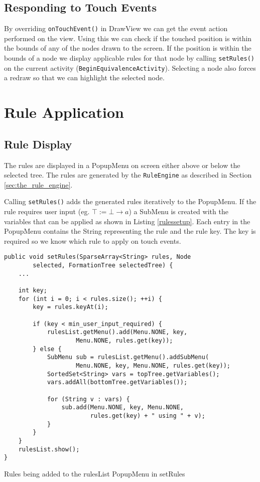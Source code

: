 \documentclass{report}
\begin{document}
\subsection{Responding to Touch Events}

By overriding {\tt onTouchEvent()} in DrawView we can get the event action performed on the view. Using this we can check if the touched position is within the bounds of any of the nodes drawn to the screen. If the position is within the bounds of a node we display applicable rules for that node by calling {\tt setRules()} on the current activity ({\tt BeginEquivalenceActivity}). Selecting a node also forces a redraw so that we can highlight the selected node.

\section{Rule Application}

\subsection{Rule Display}

The rules are displayed in a PopupMenu on screen either above or below the selected tree. The rules are generated by the {\tt RuleEngine} as described in Section \ref{sec:the_rule_engine}.

Calling {\tt setRules()} adds the generated rules iteratively to the PopupMenu. If the rule requires user input (eg. $\top := \bot \to a$) a SubMenu is created with the variables that can be applied as shown in Listing \ref{rulessetup}. Each entry in the PopupMenu contains the String representing the rule and the rule key. The key is required so we know which rule to apply on touch events.

\begin{listing}[ht]
\begin{verbatim}
public void setRules(SparseArray<String> rules, Node 
        selected, FormationTree selectedTree) {
    ...

    int key;
    for (int i = 0; i < rules.size(); ++i) {
        key = rules.keyAt(i);

        if (key < min_user_input_required) {
            rulesList.getMenu().add(Menu.NONE, key, 
                    Menu.NONE, rules.get(key));
        } else {
            SubMenu sub = rulesList.getMenu().addSubMenu(
                    Menu.NONE, key, Menu.NONE, rules.get(key));
            SortedSet<String> vars = topTree.getVariables();
            vars.addAll(bottomTree.getVariables());

            for (String v : vars) {
                sub.add(Menu.NONE, key, Menu.NONE, 
                        rules.get(key) + " using " + v);
            }
        }
    }
    rulesList.show();
}
\end{verbatim}
\caption{Rules being added to the rulesList PopupMenu in setRules}
\label{rulessetup}
\end{listing}
\end{document}
